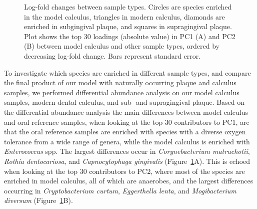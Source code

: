\documentclass[
  b5paper,
]{book}
\begin{document}
\begin{figure}


\caption{\label{fig-diffabund-comp}Log-fold changes between sample
types. Circles are species enriched in the model calculus, triangles in
modern calculus, diamonds are enriched in subgingival plaque, and
squares in supragingival plaque. Plot shows the top 30 loadings
(absolute value) in PC1 (A) and PC2 (B) between model calculus and other
sample types, ordered by decreasing log-fold change. Bars represent
standard error.}

\end{figure}%

To investigate which species are enriched in different sample types, and
compare the final product of our model with naturally occurring plaque
and calculus samples, we performed differential abundance analysis on
our model calculus samples, modern dental calculus, and sub- and
supragingival plaque. Based on the differential abundance analysis the
main differences between model calculus and oral reference samples, when
looking at the top 30 contributors to PC1, are that the oral reference
samples are enriched with species with a diverse oxygen tolerance from a
wide range of genera, while the model calculus is enriched with
\emph{Enterococcus} spp. The largest differences occur in
\emph{Corynebacterium matruchotii}, \emph{Rothia dentocariosa}, and
\emph{Capnocytophaga gingivalis} (Figure~\ref{fig-diffabund-comp}A).
This is echoed when looking at the top 30 contributors to PC2, where
most of the species are enriched in model calculus, all of which are
anaerobes, and the largest differences occurring in
\emph{Cryptobacterium curtum}, \emph{Eggerthella lenta}, and
\emph{Mogibacterium diversum} (Figure~\ref{fig-diffabund-comp}B).
\end{document}
